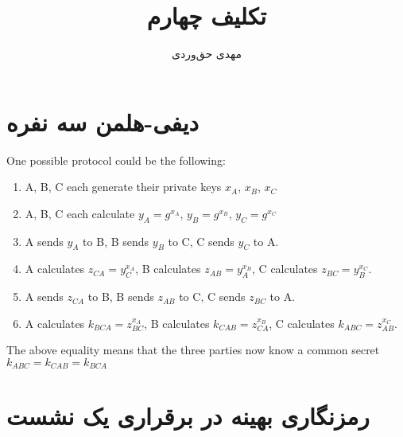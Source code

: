 \documentclass{article}
\title{تکلیف چهارم}
\author{مهدی حق‌وردی}
\begin{document}
\maketitle
\tableofcontents

\section{دیفی-هلمن سه نفره}
\begin{latin}
One possible protocol could be the following:

\begin{enumerate}
\item 
A, B, C each generate their private keys $x_A$, $x_B$, $x_C$

\item 
A, B, C each calculate $y_A = g^{x_A}$, $y_B = g^{x_B}$, $y_C = g^{x_C}$

\item 
A sends $y_A$ to B, B sends $y_B$ to C, C sends $y_C$ to A.

\item 
A calculates $z_{CA} = y^{x_A}_{C}$, B calculates $z_{AB} = y^{x_B}_{A}$, C calculates $z_{BC} = y^{x_C}_{B}$.

\item 
A sends $z_{CA}$ to B, B sends $z_{AB}$ to C, C sends $z_{BC}$ to A.

\item 
A calculates $k_{BCA} = z^{x_A}_{BC}$, 
B calculates $k_{CAB} = z^{x_B}_{CA}$,
C calculates $k_{ABC} = z^{x_C}_{AB}$.
\end{enumerate}

The above equality means that the three parties now know a common secret $k_{ABC} = k_{CAB} = k_{BCA}$

\end{latin}
\section{رمزنگاری بهینه در برقراری یک نشست }
\end{document}

